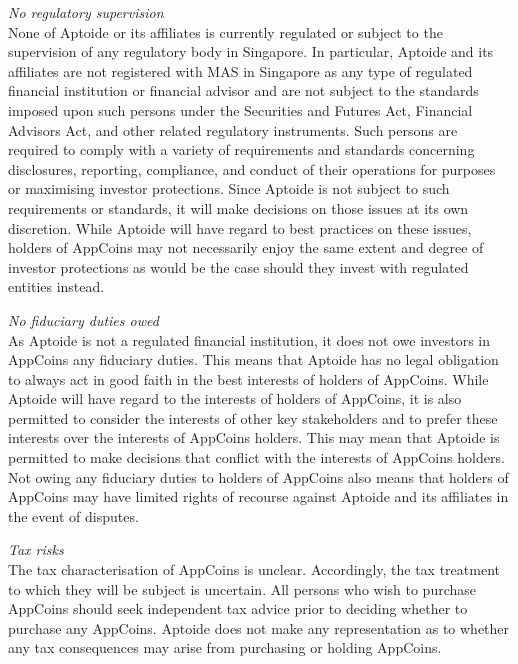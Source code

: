 \medskip

\textit{No regulatory supervision}\\
None of Aptoide or its affiliates is currently regulated or subject to the supervision of any regulatory body in Singapore. In particular, Aptoide and its affiliates are not registered with MAS in Singapore as any type of regulated financial institution or financial advisor and are not subject to the standards imposed upon such persons under the Securities and Futures Act, Financial Advisors Act, and other related regulatory instruments. Such persons are required to comply with a variety of requirements and standards concerning disclosures, reporting, compliance, and conduct of their operations for purposes or maximising investor protections. Since Aptoide is not subject to such requirements or standards, it will make decisions on those issues at its own discretion. While Aptoide will have regard to best practices on these issues, holders of AppCoins may not necessarily enjoy the same extent and degree of investor protections as would be the case should they invest with regulated entities instead.

\medskip

\textit{No fiduciary duties owed}\\
As Aptoide is not a regulated financial institution, it does not owe investors in AppCoins any fiduciary duties. This means that Aptoide has no legal obligation to always act in good faith in the best interests of holders of AppCoins. While Aptoide will have regard to the interests of holders of AppCoins, it is also permitted to consider the interests of other key stakeholders and to prefer these interests over the interests of AppCoins holders. This may mean that Aptoide is permitted to make decisions that conflict with the interests of AppCoins holders. Not owing any fiduciary duties to holders of AppCoins also means that holders of AppCoins may have limited rights of recourse against Aptoide and its affiliates in the event of disputes.

\medskip

\textit{Tax risks}\\
The tax characterisation of AppCoins is unclear. Accordingly, the tax treatment to which they will be subject is uncertain. All persons who wish to purchase AppCoins should seek independent tax advice prior to deciding whether to purchase any AppCoins. Aptoide does not make any representation as to whether any tax consequences may arise from purchasing or holding AppCoins.

